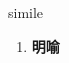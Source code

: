 
\begin{frame}
{\huge simile}
\begin{center}
\begin{enumerate}\Large
  \item \textbf{明喻}
\end{enumerate}
\end{center}
\end{frame}
